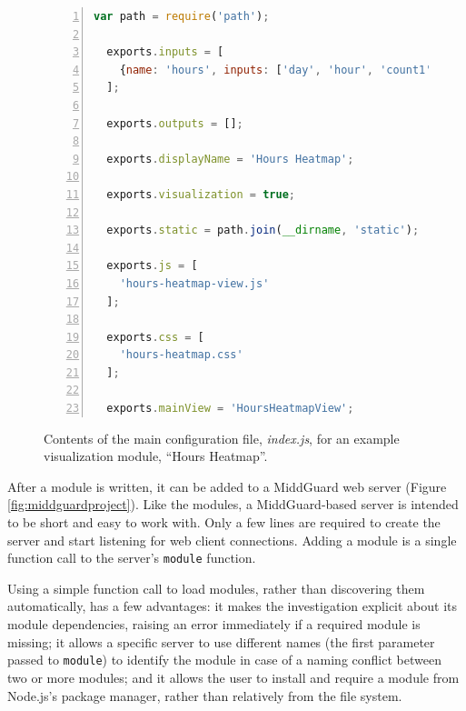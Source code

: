 \documentclass[midd]{thesis}
\begin{document}
\begin{figure}[!ht]
  \centering
  \begin{lstlisting}[numbers=left,
                     numberstyle=\footnotesize,
                     numbersep=5pt,
                     language=javascript,
                     gobble=2]
  var path = require('path');

  exports.inputs = [
    {name: 'hours', inputs: ['day', 'hour', 'count1', 'count2']}
  ];

  exports.outputs = [];

  exports.displayName = 'Hours Heatmap';

  exports.visualization = true;

  exports.static = path.join(__dirname, 'static');

  exports.js = [
    'hours-heatmap-view.js'
  ];

  exports.css = [
    'hours-heatmap.css'
  ];

  exports.mainView = 'HoursHeatmapView';
  \end{lstlisting}
  \caption[The main configuration file for a visualization module.]{Contents of
  the main configuration file, \textit{index.js}, for an example visualization
  module, ``Hours Heatmap''.}
  \label{fig:visualizationmodule}
\end{figure}

After a module is written, it can be added to a MiddGuard web server (Figure
\ref{fig:middguardproject}). Like the modules, a MiddGuard-based server is
intended to be short and easy to work with. Only a few lines are required to
create the server and start listening for web client connections. Adding a
module is a single function call to the server's \texttt{module} function.

Using a simple function call to load modules, rather than discovering them
automatically, has a few advantages: it makes the investigation explicit about
its module dependencies, raising an error immediately if a required module is
missing; it allows a specific server to use different names (the first parameter
passed to \texttt{module}) to identify the module in case of a naming conflict
between two or more modules; and it allows the user to install and require a
module from Node.js's package manager, rather than relatively from the file
system.
\end{document}
